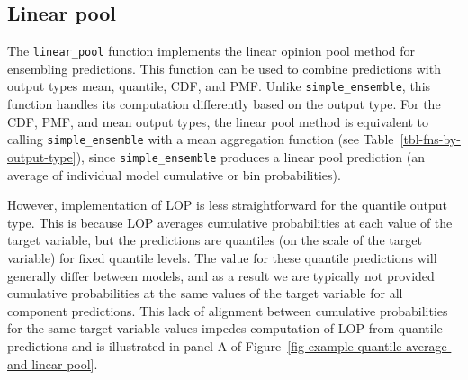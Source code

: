 \documentclass[
  article,
  shortnames,
  notitle]{jss}
\begin{document}
\begin{longtable}[]
\caption{Summary of ensemble function calculations for each output type.
The ensemble function (columns) determines the operation that is
performed, and in the case of probabilistic output types
(\texttt{quantile}, \texttt{cdf}, \texttt{pmf}), this also determines
what ensemble distribution is generated (quantile average,
\(F_{Q}^{-1}(\theta)\), or linear pool, \(F_{LOP}(x)\)). The resulting
ensemble will be returned in the same output type as the inputs. Thus,
the output type (rows) determines how the resulting ensemble
distribution is summarized (as a quantile function, \(F^{-1}(\theta)\),
cumulative distribution function, \(F(x)\), or probability mass function
\(f(x)\)). Estimating individual model cumulative probabilities is
required to compute a \texttt{linear\_pool()} for predictions of
\texttt{quantile} output type; see Section~\ref{sec-linear-pool} for
details. In the case of \texttt{simple\_ensemble()}, we report the
calculations for the default case where \texttt{agg\_fun\ =\ "mean"};
however, if another aggregation function is chosen (e.g.,
\texttt{agg\_fun\ =\ "median"}), that calculation would be performed
instead. For example,
\texttt{simple\_ensemble(...,\ agg\_fun\ =\ "median")} applied to
predictions of \texttt{mean} output type would return the median of
individual model means.}\label{tbl-fns-by-output-type}\tabularnewline
\end{longtable}

\subsection{Linear pool}\label{sec-linear-pool}

The \texttt{linear\_pool} function implements the linear opinion pool
method for ensembling predictions. This function can be used to combine
predictions with output types mean, quantile, CDF, and PMF. Unlike
\texttt{simple\_ensemble}, this function handles its computation
differently based on the output type. For the CDF, PMF, and mean output
types, the linear pool method is equivalent to calling
\texttt{simple\_ensemble} with a mean aggregation function (see
Table~\ref{tbl-fns-by-output-type}), since \texttt{simple\_ensemble}
produces a linear pool prediction (an average of individual model
cumulative or bin probabilities).

However, implementation of LOP is less straightforward for the quantile
output type. This is because LOP averages cumulative probabilities at
each value of the target variable, but the predictions are quantiles (on
the scale of the target variable) for fixed quantile levels. The value
for these quantile predictions will generally differ between models, and
as a result we are typically not provided cumulative probabilities at
the same values of the target variable for all component predictions.
This lack of alignment between cumulative probabilities for the same
target variable values impedes computation of LOP from quantile
predictions and is illustrated in panel A of
Figure~\ref{fig-example-quantile-average-and-linear-pool}.
\end{document}
